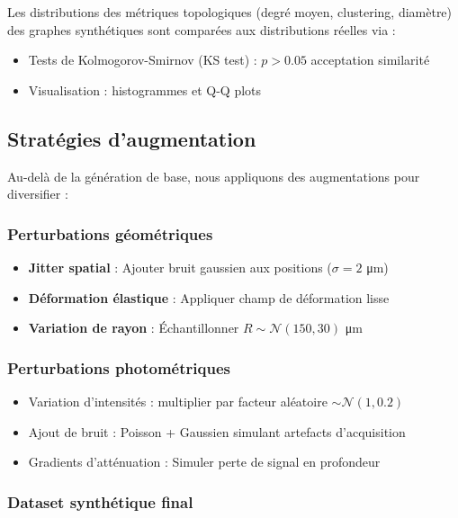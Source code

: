 Les distributions des métriques topologiques (degré moyen, clustering, diamètre) des graphes synthétiques sont comparées aux distributions réelles via :
\begin{itemize}
    \item Tests de Kolmogorov-Smirnov (KS test) : $p > 0.05$ acceptation similarité
    \item Visualisation : histogrammes et Q-Q plots
\end{itemize}

\subsection{Stratégies d'augmentation}

Au-delà de la génération de base, nous appliquons des augmentations pour diversifier :

\subsubsection{Perturbations géométriques}

\begin{itemize}
    \item \textbf{Jitter spatial} : Ajouter bruit gaussien aux positions ($\sigma = 2$ μm)
    \item \textbf{Déformation élastique} : Appliquer champ de déformation lisse
    \item \textbf{Variation de rayon} : Échantillonner $R \sim \mathcal{N}(150, 30)$ μm
\end{itemize}

\subsubsection{Perturbations photométriques}

\begin{itemize}
    \item Variation d'intensités : multiplier par facteur aléatoire $\sim \mathcal{N}(1, 0.2)$
    \item Ajout de bruit : Poisson + Gaussien simulant artefacts d'acquisition
    \item Gradients d'atténuation : Simuler perte de signal en profondeur
\end{itemize}

\subsubsection{Dataset synthétique final}

